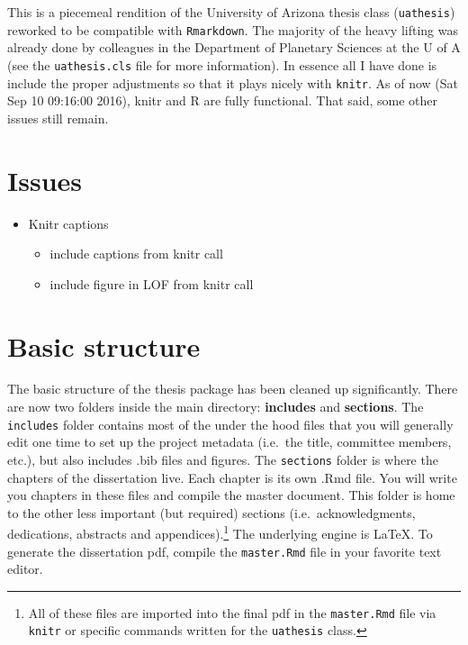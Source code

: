 \documentclass[11pt,report]{uncdissertation}
\providecommand{\tightlist}{%
  \setlength{\itemsep}{0pt}\setlength{\parskip}{0pt}}
\let\rmarkdownfootnote\footnote%
\def\footnote{\protect\rmarkdownfootnote}
\begin{document}
This is a piecemeal rendition of the University of Arizona thesis class
(\texttt{uathesis}) reworked to be compatible with \texttt{Rmarkdown}.
The majority of the heavy lifting was already done by colleagues in the
Department of Planetary Sciences at the U of A (see the
\texttt{uathesis.cls} file for more information). In essence all I have
done is include the proper adjustments so that it plays nicely with
\texttt{knitr}. As of now (Sat Sep 10 09:16:00 2016), knitr and R are
fully functional. That said, some other issues still remain.

\section{\texorpdfstring{Issues\label{issues}}{Issues}}\label{issues}

\begin{itemize}
\tightlist
\item
  Knitr captions

  \begin{itemize}
  \tightlist
  \item
    include captions from knitr call
  \item
    include figure in LOF from knitr call
  \end{itemize}
\end{itemize}

\section{Basic structure}\label{basic-structure}

The basic structure of the thesis package has been cleaned up
significantly. There are now two folders inside the main directory:
\textbf{includes} and \textbf{sections}. The \texttt{includes} folder
contains most of the under the hood files that you will generally edit
one time to set up the project metadata (i.e.~the title, committee
members, etc.), but also includes .bib files and figures. The
\texttt{sections} folder is where the chapters of the dissertation live.
Each chapter is its own .Rmd file. You will write you chapters in these
files and compile the master document. This folder is home to the other
less important (but required) sections (i.e.~acknowledgments,
dedications, abstracts and appendices).\footnote{All of these files are
  imported into the final pdf in the \texttt{master.Rmd} file via
  \texttt{knitr} or specific commands written for the \texttt{uathesis}
  class.} The underlying engine is \LaTeX. To generate the dissertation
pdf, compile the \texttt{master.Rmd} file in your favorite text editor.
\end{document}
